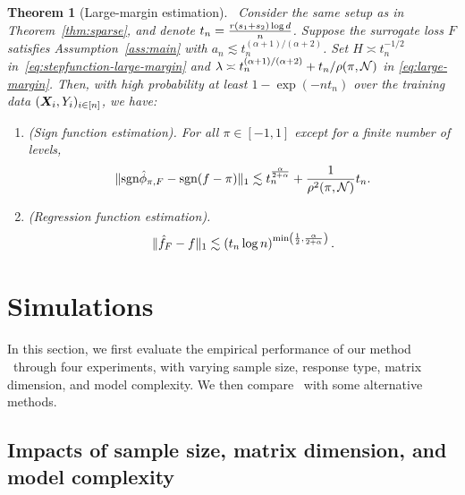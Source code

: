 \documentclass[11pt]{article}
\theoremstyle{plain}
\newtheorem{thm}{Theorem}[section]
\theoremstyle{definition}
\def\sign{\textup{sgn}}
\def\NonparaM{\text{\bf \footnotesize ASSIST}}
\begin{document}
\begin{thm}[Large-margin estimation]~\label{thm:extension} 
Consider the same setup as in Theorem~\ref{thm:sparse}, and denote $t_n = {r(s_1+s_2)\log d \over n}$. Suppose the surrogate loss $F$ satisfies Assumption~\ref{ass:main} with $a_n \lesssim t_n^{(\alpha+1)/(\alpha+2)}$. Set $H\asymp t_n^{-1/2}$ in~\eqref{eq:stepfunction-large-margin} and $\lambda\asymp t_n^{(\alpha+1)/(\alpha+2)}+t_n/\rho(\pi,\mathcal{N})$ in \eqref{eq:large-margin}. Then, with high probability at least $1-\exp(-nt_n)$ over the training data $(\bm X_i,Y_i)_{i\in[n]}$, we have:
\begin{enumerate}[label=(\alph*)]
\item (Sign function estimation). For all $\pi\in[-1,1]$ except for a finite number of levels,
\begin{equation*}
\onenormSize{}{\sign\hat \phi_{\pi,F}-\sign(f-\pi)}\lesssim t_n ^{\alpha\over 2+\alpha}+{1\over \rho^2(\pi,\tN)}t_n.
\end{equation*}

\item (Regression function estimation). 
\begin{equation*}
\lVert\hat f_{F}- f\rVert_1 \lesssim  \left(t_n\log n\right)^{\min\left( {1\over 2},{\alpha \over 2+\alpha} \right)}.
\end{equation*}
\end{enumerate}
\end{thm}





\section{Simulations}
\label{sec:simulation}

In this section, we first evaluate the empirical performance of our method \NonparaM\ through four experiments, with varying sample size, response type, matrix dimension, and model complexity. We then compare \NonparaM\ with some alternative methods. 



\subsection{Impacts of sample size, matrix dimension, and model complexity}
\label{sec:validation}
\end{document}
